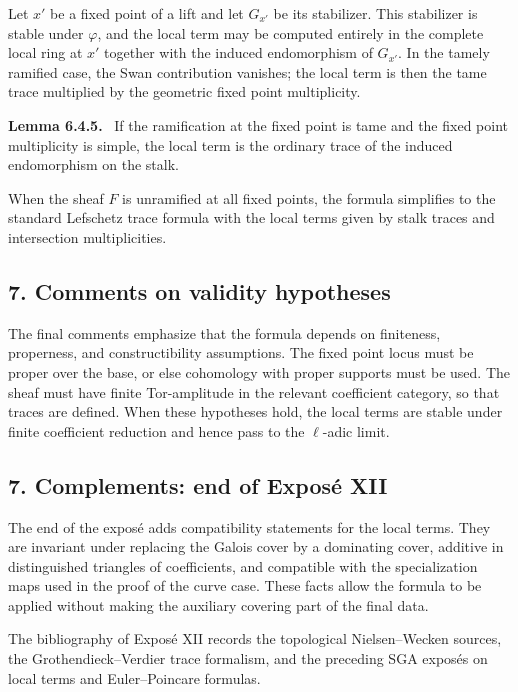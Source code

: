 \documentclass[14pt]{extarticle}
\newenvironment{statement}[1]{\par\medskip\noindent\textbf{#1.}\ }{\par\medskip}
\begin{document}
Let $x'$ be a fixed point of a lift and let $G_{x'}$ be its stabilizer. This stabilizer is stable under $\varphi$, and the local term may be computed entirely in the complete local ring at $x'$ together with the induced endomorphism of $G_{x'}$. In the tamely ramified case, the Swan contribution vanishes; the local term is then the tame trace multiplied by the geometric fixed point multiplicity.

\begin{statement}{Lemma 6.4.5}
If the ramification at the fixed point is tame and the fixed point multiplicity is simple, the local term is the ordinary trace of the induced endomorphism on the stalk.
\end{statement}

When the sheaf $F$ is unramified at all fixed points, the formula simplifies to the standard Lefschetz trace formula with the local terms given by stalk traces and intersection multiplicities.

\subsection*{7. Comments on validity hypotheses}

The final comments emphasize that the formula depends on finiteness, properness, and constructibility assumptions. The fixed point locus must be proper over the base, or else cohomology with proper supports must be used. The sheaf must have finite Tor-amplitude in the relevant coefficient category, so that traces are defined. When these hypotheses hold, the local terms are stable under finite coefficient reduction and hence pass to the $\ell$-adic limit.

\subsection*{7. Complements: end of Expos\'e XII}

The end of the expos\'e adds compatibility statements for the local terms. They are invariant under replacing the Galois cover by a dominating cover, additive in distinguished triangles of coefficients, and compatible with the specialization maps used in the proof of the curve case. These facts allow the formula to be applied without making the auxiliary covering part of the final data.

The bibliography of Expos\'e XII records the topological Nielsen--Wecken sources, the Grothendieck--Verdier trace formalism, and the preceding SGA expos\'es on local terms and Euler--Poincare formulas.
\end{document}
